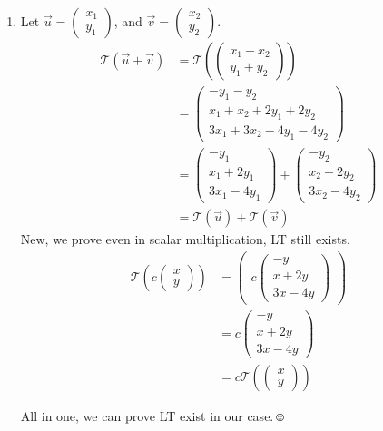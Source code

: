 \documentclass[11pt]{article} %
\begin{document}
\begin{enumerate}
\item
Let $\vec{u}=\begin{pmatrix}
	x_1\\
	y_1
\end{pmatrix}$, and $\vec{v}=\begin{pmatrix}
x_2\\
y_2
\end{pmatrix}$.
\begin{align*}
	\mathcal{T}(\vec{u}+\vec{v})&=\mathcal{T}(\begin{pmatrix}
		x_1+x_2\\
		y_1+y_2
	\end{pmatrix})\\
&=\begin{pmatrix}
	-y_1-y_2\\
	x_1+x_2+2y_1+2y_2\\
	3x_1+3x_2-4y_1-4y_2
\end{pmatrix}\\
&=\begin{pmatrix}
	-y_1\\
	x_1+2y_1\\
	3x_1-4y_1
\end{pmatrix}+\begin{pmatrix}
-y_2\\
x_2+2y_2\\
3x_2-4y_2
\end{pmatrix}\\
&=\mathcal{T}(\vec{u})+\mathcal{T}(\vec{v})
\end{align*}
New, we prove even in scalar multiplication, LT still exists.
\begin{align*}
	\mathcal{T}(c\begin{pmatrix}
		x\\
		y
	\end{pmatrix})&=\begin{pmatrix}
	c\begin{pmatrix}
		-y\\
		x+2y\\
		3x-4y
	\end{pmatrix}
\end{pmatrix}\\
&=c\begin{pmatrix}
	-y\\
	x+2y\\
	3x-4y
\end{pmatrix}\\
&=c\mathcal{T}(\begin{pmatrix}
	x\\
	y
\end{pmatrix})
\end{align*}

All in one, we can prove LT exist in our case.$\smiley$
\end{enumerate}
\end{document}
